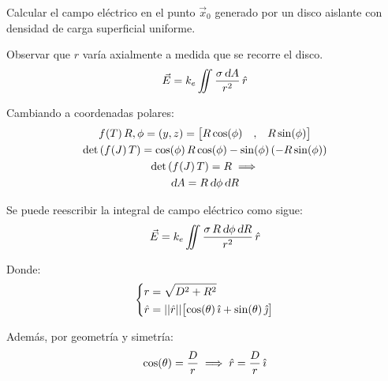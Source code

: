 \begin{mdframed}[style=ExampleFrame]
    \begin{example}
    \end{example}
    \begin{formatI}
        Calcular el campo eléctrico en el punto $\vec{x}_0$ generado por un disco aislante con densidad de carga superficial uniforme.
    \end{formatI}

    \begin{center}
        \def\svgwidth{\linewidth}
        
    \end{center}

    Observar que $r$ varía axialmente a medida que se recorre el disco.
    \begin{equation*}
        \vec{E} = k_e \iint \frac{\sigma \, \textsl{d} A}{r^2} \, \hat{r}
    \end{equation*}

    Cambiando a coordenadas polares:
    \begin{gather*}
        f \hspace{-0.5mm} \left( T \right){R,\phi} = (y,z) = { \begin{bmatrix} R \cos(\phi) &,& R \sin(\phi) \end{bmatrix} }
        \\
        \det \left(f \hspace{-0.5mm} \left( J \right){T}\right) = \cos(\phi) \, R \cos(\phi) - \sin(\phi) \left(-R \sin(\phi)\right)
        \\
        \det \left(f \hspace{-0.5mm} \left( J \right){T}\right) = R \implies
        \\
        \textsl{d} A = R \, \textsl{d} \phi \, \textsl{d} R
    \end{gather*}

    Se puede reescribir la integral de campo eléctrico como sigue:
    \begin{equation*}
        \vec{E} = k_e \iint \frac{\sigma \, R \, \textsl{d} \phi \, \textsl{d} R}{r^2} \, \hat{r}
    \end{equation*}

    Donde:
    \begin{equation*}
        \left\{
        \begin{aligned}
            & r = \sqrt{D^2 + R^2}
            \\
            & \hat{r} = {\left|\left| {\hat{r}} \right|\right|} { \begin{bmatrix} \cos(\theta) \, \hat{\imath} + \sin(\theta) \, \hat{\jmath} \end{bmatrix} }
        \end{aligned}
        \right.
    \end{equation*}

    Además, por geometría y simetría:
    \begin{equation*}
        \cos(\theta) = \frac{D}{r} \implies \hat{r} = \frac{D}{r} \, \hat{\imath}
    \end{equation*}
    

\end{mdframed}

